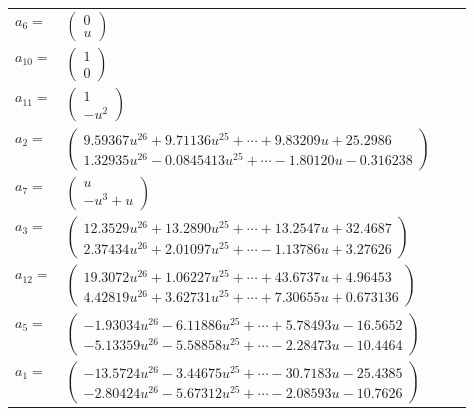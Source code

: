 \documentclass[1p]{elsarticle_modified}
\theoremstyle{definition}
\begin{document}
\begin{tabular}{m{7pt} m{180pt} m{7pt} m{180pt} }
\flushright $a_{6}=$&$\begin{pmatrix}0\\u\end{pmatrix}$ \\
\flushright $a_{10}=$&$\begin{pmatrix}1\\0\end{pmatrix}$ \\
\flushright $a_{11}=$&$\begin{pmatrix}1\\- u^2\end{pmatrix}$ \\
\flushright $a_{2}=$&$\begin{pmatrix}9.59367 u^{26}+9.71136 u^{25}+\cdots+9.83209 u+25.2986\\1.32935 u^{26}-0.0845413 u^{25}+\cdots-1.80120 u-0.316238\end{pmatrix}$ \\
\flushright $a_{7}=$&$\begin{pmatrix}u\\- u^3+u\end{pmatrix}$ \\
\flushright $a_{3}=$&$\begin{pmatrix}12.3529 u^{26}+13.2890 u^{25}+\cdots+13.2547 u+32.4687\\2.37434 u^{26}+2.01097 u^{25}+\cdots-1.13786 u+3.27626\end{pmatrix}$ \\
\flushright $a_{12}=$&$\begin{pmatrix}19.3072 u^{26}+1.06227 u^{25}+\cdots+43.6737 u+4.96453\\4.42819 u^{26}+3.62731 u^{25}+\cdots+7.30655 u+0.673136\end{pmatrix}$ \\
\flushright $a_{5}=$&$\begin{pmatrix}-1.93034 u^{26}-6.11886 u^{25}+\cdots+5.78493 u-16.5652\\-5.13359 u^{26}-5.58858 u^{25}+\cdots-2.28473 u-10.4464\end{pmatrix}$ \\
\flushright $a_{1}=$&$\begin{pmatrix}-13.5724 u^{26}-3.44675 u^{25}+\cdots-30.7183 u-25.4385\\-2.80424 u^{26}-5.67312 u^{25}+\cdots-2.08593 u-10.7626\end{pmatrix}$ \\

\end{tabular}
\end{document}
